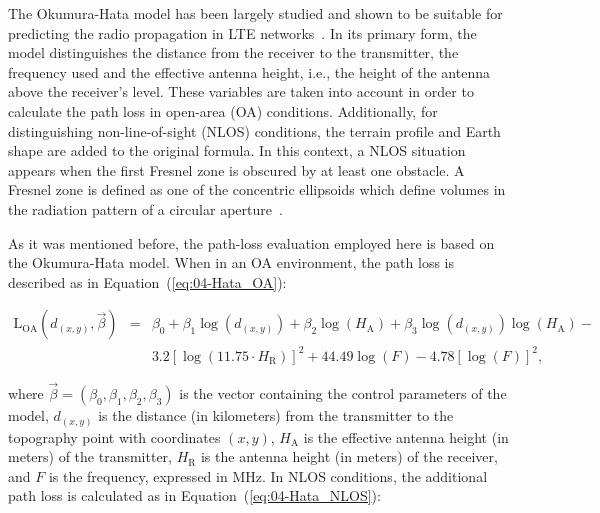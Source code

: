 The Okumura-Hata model has been largely studied and shown to be suitable
for predicting the radio propagation in LTE networks~\cite{Ahmad:Studying_different_propagation_models_for_LTE_system:2012,Shabbir_Comparison_of_radio_propagation_models:2011}.
In its primary form, the model distinguishes the distance from the
receiver to the transmitter, the frequency used and the effective
antenna height, i.e., the height of the antenna above the receiver's
level. These variables are taken into account in order to calculate
the path loss in open-area (OA) conditions.
Additionally, for distinguishing non-line-of-sight (NLOS)
conditions, the terrain profile and Earth shape are added to the original
formula. In this context, a NLOS situation appears when the first
Fresnel zone is obscured by at least one obstacle. A Fresnel zone
is defined as one of the concentric ellipsoids which define volumes
in the radiation pattern of a circular aperture~\cite{Xia-Radio_propagation_characteristics_for_line_of_sight_microcellular_and_personal_communications:1993}.

As it was mentioned before, the path-loss evaluation employed here
is based on the Okumura-Hata model. When in an OA environment, the
path loss is described as in Equation~(\ref{eq:04-Hata_OA}):

\begin{eqnarray}
\mathrm{L}{}_{\mathrm{OA}}(d_{(x,y)},\vec{\beta}) & = & \beta_{0}+\beta_{1}\log(d_{(x,y)})+\beta_{2}\log(H_{\mathrm{A}})+\beta_{3}\log(d_{(x,y)})\log(H_{\mathrm{A}})-\nonumber \\
 &  & 3.2\left[\log(11.75\cdot H_{\mathrm{R}})\right]^{2}+44.49\log(F)-4.78\left[\log(F)\right]^{2},\label{eq:04-Hata_OA}
\end{eqnarray}


\noindent {}

\noindent where $\vec{\beta}=(\beta_{0},\beta_{1},\beta_{2},\beta_{3})$
is the vector containing the control parameters of the model, $d_{(x,y)}$
is the distance (in kilometers) from the transmitter to the topography
point with coordinates $(x,y)$, $H_{\mathrm{A}}$ is the effective
antenna height (in meters) of the transmitter, $H_{\mathrm{R}}$ is
the antenna height (in meters) of the receiver, and $F$ is the frequency,
expressed in MHz. In NLOS conditions, the additional path loss is
calculated as in Equation~(\ref{eq:04-Hata_NLOS}):

